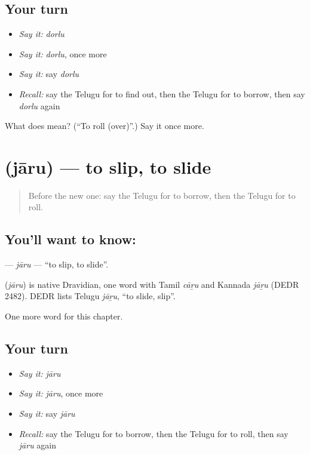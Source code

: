 \subsection*{Your turn}
\begin{itemize}
\raggedright
  \item \emph{Say it:} \emph{dorlu}
  \item \emph{Say it:} \emph{dorlu}, once more
  \item \emph{Say it:} say \emph{dorlu}
  \item \emph{Recall:} say the Telugu for to find out, then the Telugu for to borrow, then say \emph{dorlu} again
\end{itemize}

\begin{tcolorbox}[breakable,colback=teal!4,colframe=teal!35!black,title={Before you move on}]
What does  mean? (\textquotedblleft{}To roll (over)\textquotedblright{}.) Say it once more.
\end{tcolorbox}
\section[\texorpdfstring{\te{జారు} (jāru)}{జారు (jāru)}]{ (jāru) — to slip, to slide}

\label{lesson:TE-C206-jaru}



\begin{quote}
Before the new one: say the Telugu for to borrow, then the Telugu for to roll.
\end{quote}

\subsection*{You'll want to know: }
\textbf{} — \emph{jāru} — \textquotedblleft{}to slip, to slide\textquotedblright{}.

\begin{cousinweb}
\textbf{} (\emph{jāru}) is native Dravidian, one word with Tamil \emph{cāṟu} and Kannada \emph{jāṟu} (DEDR 2482). DEDR lists Telugu \emph{jāṟu}, \textquotedblleft{}to slide, slip\textquotedblright{}.
\end{cousinweb}

\begin{grammarlens}[title={What you've built}]
One more word for this chapter.
\end{grammarlens}

\subsection*{Your turn}
\begin{itemize}
\raggedright
  \item \emph{Say it:} \emph{jāru}
  \item \emph{Say it:} \emph{jāru}, once more
  \item \emph{Say it:} say \emph{jāru}
  \item \emph{Recall:} say the Telugu for to borrow, then the Telugu for to roll, then say \emph{jāru} again
\end{itemize}

